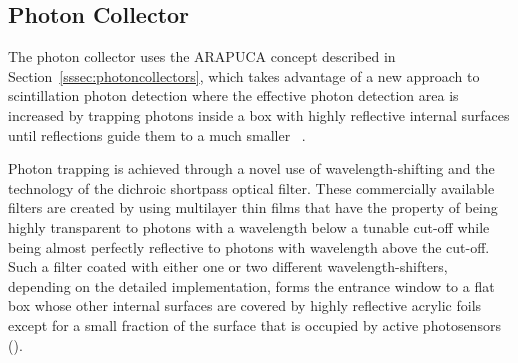 
\subsection{Photon Collector}
\label{ssec:fdsp-pd-pc-arapuca}

The  photon collector uses the ARAPUCA concept described in Section~\ref{sssec:photoncollectors}, which takes advantage of a new approach to \lar scintillation photon detection where the effective photon detection area is increased by trapping photons inside a box with highly reflective internal surfaces until reflections guide them to a much smaller ~\cite{arapuca_jinst}. 

Photon trapping is achieved through a novel use of wavelength-shifting and the technology of the dichroic shortpass optical filter. These commercially available filters are created by using multilayer thin films that have the property of being highly transparent to photons with a wavelength below a tunable cut-off while being almost perfectly reflective to photons with wavelength above the cut-off.  Such a filter coated with either one or two different wavelength-shifters, depending on the detailed implementation, forms the entrance window to a flat box whose other internal surfaces are covered by highly reflective acrylic foils
except for a small fraction of the surface that is occupied by active photosensors ().

